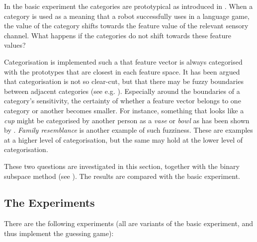 In the basic experiment the categories are prototypical as introduced in . When a category is used as a meaning that a robot successfully uses in a language game, the value of the category shifts towards the feature value of the relevant sensory channel. What happens if the categories do not shift towards these feature values?

Categorisation is implemented such a that feature vector is always categorised with the prototypes that are closest in each feature space. It has been argued that categorisation is not so clear-cut, but that there may be fuzzy boundaries between adjacent categories (see e.g. \citep{aitchison:1987,lakoff:1987}). Especially around the boundaries of a category's sensitivity, the certainty of whether a feature vector belongs to one category or another becomes smaller. For instance, something that looks like a {\em cup} might be categorised by another person as a {\em vase} or {\em bowl} as has been shown by \citep{labov:1973}. {\em Family resemblance} \citep{wittgenstein:1958} is another example of such fuzziness.  These are examples at a higher level of categorisation, but the same may hold at the lower level of categorisation.

These two questions are investigated in this section, together with the binary subspace method (see ). The results are compared with the basic experiment.

\subsection{The Experiments}

There are the following experiments (all are variants of the basic experiment, and thus implement the guessing game):

